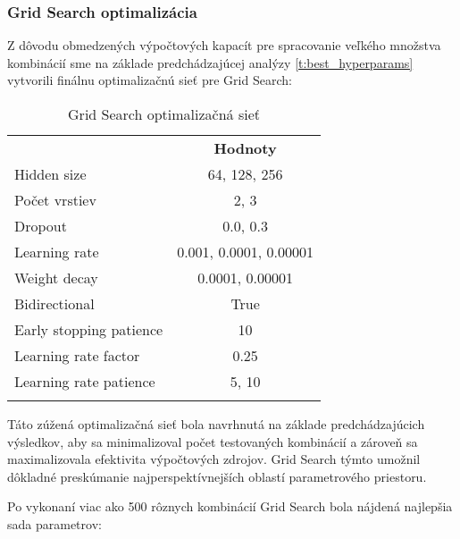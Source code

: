 \subsubsection{Grid Search optimalizácia}
\label{sec:grid_search}
Z dôvodu obmedzených výpočtových kapacít pre spracovanie veľkého množstva kombinácií sme na základe predchádzajúcej analýzy \ref{t:best_hyperparams} vytvorili finálnu optimalizačnú sieť pre Grid Search:

\begin{table}[ht!]
\centering
\caption{Grid Search optimalizačná sieť}\label{t:grid_search}
\medskip
\small
\begin{tabular}{||l||c||}
\hhline{|t:==:t|}
\multicolumn{1}{||c||}{\textbf{Hyperparameter}} & \multicolumn{1}{c||}{\textbf{Hodnoty}} \\
\hhline{|:==:|}
Hidden size & 64, 128, 256 \\
\hline
Počet vrstiev & 2, 3 \\
\hline
Dropout & 0.0, 0.3 \\
\hline
Learning rate & 0.001, 0.0001, 0.00001 \\
\hline
Weight decay & 0.0001, 0.00001 \\
\hline
Bidirectional & True \\
\hline
Early stopping patience & 10 \\
\hline
Learning rate factor & 0.25 \\
\hline
Learning rate patience & 5, 10 \\
\hhline{|b:==:b|}
\end{tabular}
\end{table}

Táto zúžená optimalizačná sieť bola navrhnutá na základe predchádzajúcich výsledkov, aby sa minimalizoval počet testovaných kombinácií a zároveň sa maximalizovala efektivita výpočtových zdrojov. Grid Search týmto umožnil dôkladné preskúmanie najperspektívnejších oblastí parametrového priestoru.

\newpage

Po vykonaní viac ako 500 rôznych kombinácií Grid Search bola nájdená najlepšia sada parametrov:

